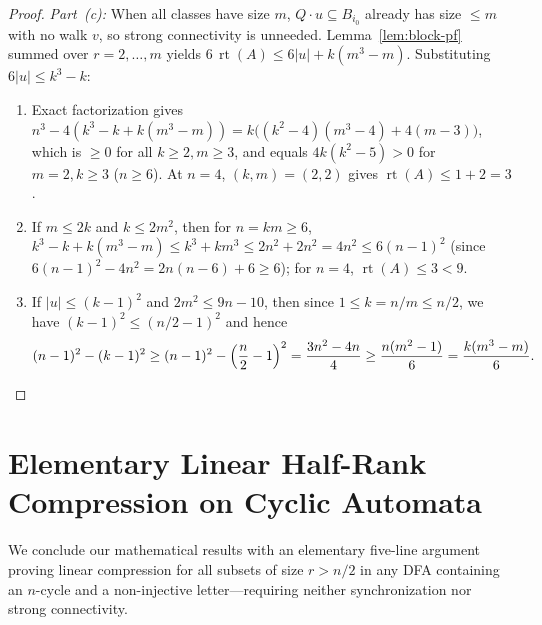 \documentclass[11pt,a4paper]{article}
\theoremstyle{definition}
\theoremstyle{remark}
\newcommand{\rt}{\operatorname{rt}}
\begin{document}
\begin{proof}
\emph{Part~(c):} When all classes have size $m$, $Q \cdot u \subseteq B_{i_0}$ already has size $\le m$ with no walk $v$, so strong connectivity is unneeded. Lemma~\ref{lem:block-pf} summed over $r = 2, \dots, m$ yields $6\,\rt(A) \le 6|u| + k(m^3 - m)$. Substituting $6|u| \le k^3 - k$:
\begin{enumerate}[label=\textup{(\roman*)},nosep]
  \item Exact factorization gives $n^3 - 4(k^3 - k + k(m^3 - m)) = k\bigl((k^2 - 4)(m^3 - 4) + 4(m - 3)\bigr)$, which is $\ge 0$ for all $k \ge 2, m \ge 3$, and equals $4k(k^2 - 5) > 0$ for $m = 2, k \ge 3$ ($n \ge 6$). At $n = 4$, $(k, m) = (2, 2)$ gives $\rt(A) \le 1 + 2 = 3$.
  \item If $m \le 2k$ and $k \le 2m^2$, then for $n = km \ge 6$, $k^3 - k + k(m^3 - m) \le k^3 + km^3 \le 2n^2 + 2n^2 = 4n^2 \le 6(n - 1)^2$ (since $6(n - 1)^2 - 4n^2 = 2n(n - 6) + 6 \ge 6$); for $n = 4$, $\rt(A) \le 3 < 9$.
  \item If $|u| \le (k - 1)^2$ and $2m^2 \le 9n - 10$, then since $1 \le k = n / m \le n / 2$, we have $(k - 1)^2 \le (n/2 - 1)^2$ and hence
  \[
    (n - 1)^2 - (k - 1)^2 \ge (n - 1)^2 - \left(\frac{n}{2} - 1\right)^2 = \frac{3n^2 - 4n}{4} \ge \frac{n(m^2 - 1)}{6} = \frac{k(m^3 - m)}{6}. \qedhere
  \]
\end{enumerate}
\end{proof}

\section{Elementary Linear Half-Rank Compression on Cyclic Automata}\label{sec:cycle-shift}

We conclude our mathematical results with an elementary five-line argument proving linear compression for all subsets of size $r > n / 2$ in any DFA containing an $n$-cycle and a non-injective letter---requiring neither synchronization nor strong connectivity.
\end{document}
